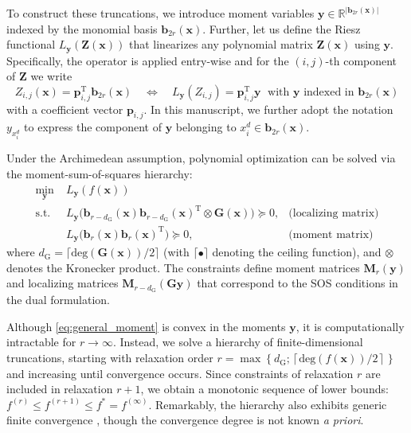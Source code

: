 \documentclass[final,onefignum,onetabnum]{siamart220329}
\begin{document}
{To construct these truncations, we introduce moment variables $\mathbf{y} \in \mathbb{R}^{|\mathbf{b}_{2r}(\mathbf{x})|}$ indexed by the monomial basis $\mathbf{b}_{2r}(\mathbf{x})$. Further, let us define} the Riesz functional $L_\mathbf{y} (\mathbf{Z}(\mathbf{x}))$ that linearizes {any} polynomial matrix $\mathbf{Z}(\mathbf{x})$ using $\mathbf{y}$. Specifically, the operator is applied entry-wise and for the $(i,j)$-th component of $\mathbf{Z}$ we write
%
\begin{equation}
    Z_{i,j}(\mathbf{x}) = \mathbf{p}_{{{i,j}}}^\mathrm{T} \mathbf{b}_{2r}(\mathbf{x})\quad \Longleftrightarrow \quad L_\mathbf{y}(Z_{i,j}) = \mathbf{p}_{{{i,j}}}^\mathrm{T} \mathbf{y}\; \text{ with }\mathbf{y}\text{ indexed in }\mathbf{b}_{2r}(\mathbf{x})
\end{equation}
%
with a coefficient vector $\mathbf{p}_{{{i,j}}}$. In this manuscript, we further adopt the notation $y_{x_i^d}$ to express the component of $\mathbf{y}$ belonging to $x_i^d \in \mathbf{b}_{2r}(\mathbf{x})$.

{
Under the Archimedean assumption, polynomial optimization can be solved via the moment-sum-of-squares hierarchy:
%
\begin{subequations}\label{eq:general_moment}
\begin{align}
    \min_{\mathbf{y}} \; & L_\mathbf{y}(f(\mathbf{x}))\\
    \mathrm{s.t.}\; & L_{\mathbf{y}}\bigl(\mathbf{b}_{r-d_\mathrm{G}}(\mathbf{x}) \mathbf{b}_{r-d_\mathrm{G}}(\mathbf{x})^\mathrm{T} \otimes \mathbf{G}(\mathbf{x})\bigr) \succeq 0, & \text{(localizing matrix)}\label{eq:localizing}\\
    & L_{\mathbf{y}}\bigl(\mathbf{b}_r(\mathbf{x}) \mathbf{b}_r(\mathbf{x})^\mathrm{T}\bigr) \succeq 0, & \text{(moment matrix)}\label{eq:moment}
\end{align}
\end{subequations}
%
where $d_\mathrm{G}= \lceil \mathrm{deg}(\mathbf{G}(\mathbf{x}))/2 \rceil$ (with $\lceil \bullet \rceil$ denoting the ceiling function), and $\otimes$ denotes the Kronecker product. The constraints define moment matrices $\mathbf{M}_r(\mathbf{y})$ and localizing matrices $\mathbf{M}_{r-d_\mathrm{G}} (\mathbf{G}\mathbf{y})$ that correspond to the SOS conditions in the dual formulation.}

{Although \eqref{eq:general_moment} is convex in the moments $\mathbf{y}$, it is computationally intractable for $r\rightarrow \infty$. Instead, we solve a hierarchy of finite-dimensional truncations, starting with relaxation order $r = \max\left\{d_\mathrm{G}; \left\lceil\mathrm{deg}(f(\mathbf{x}))/2\right\rceil\right\}$ and increasing until convergence occurs. Since constraints of relaxation $r$ are included in relaxation $r+1$, we obtain a monotonic sequence of lower bounds: $f^{(r)} \le f^{(r+1)} \le f^* = f^{(\infty)}$. Remarkably, the hierarchy also exhibits generic finite convergence \cite{Nie2013}, though the convergence degree is not known \textit{a priori}.}
\end{document}
